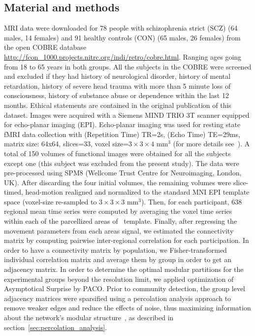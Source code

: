 \subsection{Material and methods}
MRI data were downloaded for 78 people with schizophrenia strict (SCZ) (64 males, 14 females) and 91 healthy controls (CON) (65 males, 26 females) from the open COBRE database \url{http://fcon_1000.projects.nitrc.org/indi/retro/cobre.html}.
Ranging ages going from 18 to 65 years in both groups.
All the subjects in the COBRE were screened and excluded if they had history of neurological disorder, history of mental retardation, history of severe head trauma with more than 5 minute loss of consciousness, history of substance abuse or dependence within the last 12 months.
Ethical statements are contained in the original publication of this dataset.
Images were acquired with a Siemens MIND TRIO 3T scanner equipped for echo-planar imaging (EPI).
Echo-planar imaging was used for resting state fMRI data collection with (Repetition Time) TR=2s, (Echo Time) TE=29ms, matrix size: 64x64, slices=33, voxel size=$3 \times 3 \times 4$ mm$^3$ (for more details see~\cite{cetin2014}).
A total of 150 volumes of functional images were obtained for all the subjects except one (this subject was excluded from the present study).
The data were pre-processed using SPM8 (Wellcome Trust Centre for Neuroimaging, London, UK).
After discarding the four initial volumes, the remaining volumes were slice-timed, head-motion realigned and normalized to the standard MNI EPI template space (voxel-size re-sampled to $3 \times 3 \times 3$ mm$^3$).
Then, for each participant, 638 regional mean time series were computed by averaging the voxel time series within each of the parcellized areas of~\cite{crossley2013a} template. 
Finally, after regressing the movement parameters from each areas signal, we estimated the connectivity matrix by computing pairwise inter-regional correlation for each participation.
In order to have a connectivity matrix by population, we Fisher-transformed individual correlation matrix and average them by group in order to get an adjacency matrix.
In order to determine the optimal modular partitions for the experimental groups beyond the resolution limit, we applied optimization of Asymptotical Surprise by PACO.
Prior to community detection, the group level adjacency matrices were sparsified using a percolation analysis approach to remove weaker edges and reduce the effects of noise, thus maximizing information about the network's modular structure~\cite{nicolini2017,bardella2016a,gallos2012}, as described in section~\ref{sec:percolation_analysis}.
